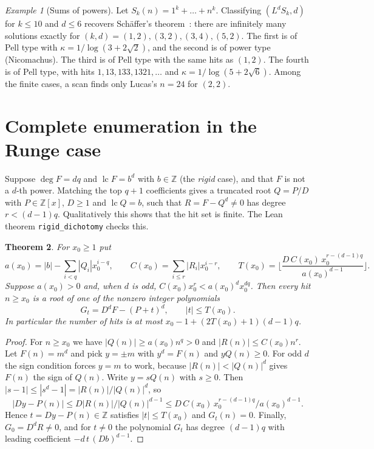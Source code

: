 \documentclass[11pt]{amsart}
\newtheorem{theorem}{Theorem}[section]
\theoremstyle{definition}
\theoremstyle{remark}
\newtheorem{example}[theorem]{Example}
\newcommand{\Z}{\mathbb{Z}}
\newcommand{\lc}{\operatorname{lc}}
\newcommand{\lean}[1]{\texttt{#1}}
\begin{document}
\begin{example}[Sums of powers]
Let $S_k(n)=1^k+\dots+n^k$. Classifying $(L^dS_k,d)$ for $k\le10$ and $d\le6$ recovers Sch\"affer's theorem~\cite{Schaffer}: there are infinitely many solutions exactly for $(k,d)=(1,2),(3,2),(3,4),(5,2)$. The first is of Pell type with $\kappa=1/\log(3+2\sqrt2)$, and the second is of power type (Nicomachus). The third is of Pell type with the same hits as $(1,2)$. The fourth is of Pell type, with hits $1,13,133,1321,\dots$ and $\kappa=1/\log(5+2\sqrt6)$. Among the finite cases, a scan finds only Lucas's $n=24$ for $(2,2)$.
\end{example}

\section{Complete enumeration in the Runge case}\label{sec:runge}

Suppose $\deg F=dq$ and $\lc F=b^d$ with $b\in\Z$ (the \emph{rigid} case), and that $F$ is not a $d$-th power. Matching the top $q+1$ coefficients gives a truncated root $Q=P/D$ with $P\in\Z[x]$, $D\ge1$ and $\lc Q=b$, such that $R=F-Q^d\ne0$ has degree $r<(d-1)q$. Qualitatively this shows that the hit set is finite. The Lean theorem \lean{rigid\_dichotomy} checks this.

\begin{theorem}\label{thm:runge}
For $x_0\ge1$ put
\[
a(x_0)=|b|-\sum_{i<q}|Q_i|x_0^{i-q},\qquad C(x_0)=\sum_{i\le r}|R_i|x_0^{i-r},\qquad T(x_0)=\Big\lfloor\frac{D\,C(x_0)\,x_0^{r-(d-1)q}}{a(x_0)^{d-1}}\Big\rfloor .
\]
Suppose $a(x_0)>0$ and, when $d$ is odd, $C(x_0)x_0^r<a(x_0)^dx_0^{dq}$. Then every hit $n\ge x_0$ is a root of one of the nonzero integer polynomials
\[
G_t=D^dF-(P+t)^d,\qquad |t|\le T(x_0).
\]
In particular the number of hits is at most $x_0-1+(2T(x_0)+1)(d-1)q$.
\end{theorem}

\begin{proof}
For $n\ge x_0$ we have $|Q(n)|\ge a(x_0)n^q>0$ and $|R(n)|\le C(x_0)n^r$. Let $F(n)=m^d$ and pick $y=\pm m$ with $y^d=F(n)$ and $yQ(n)\ge0$. For odd $d$ the sign condition forces $y=m$ to work, because $|R(n)|<|Q(n)|^d$ gives $F(n)$ the sign of $Q(n)$. Write $y=sQ(n)$ with $s\ge0$. Then $|s-1|\le|s^d-1|=|R(n)|/|Q(n)|^d$, so
\[
|Dy-P(n)|\le D|R(n)|/|Q(n)|^{d-1}\le D\,C(x_0)\,x_0^{r-(d-1)q}/a(x_0)^{d-1}.
\]
Hence $t=Dy-P(n)\in\Z$ satisfies $|t|\le T(x_0)$ and $G_t(n)=0$. Finally, $G_0=D^dR\ne0$, and for $t\ne0$ the polynomial $G_t$ has degree $(d-1)q$ with leading coefficient $-d\,t\,(Db)^{d-1}$.
\end{proof}
\end{document}
